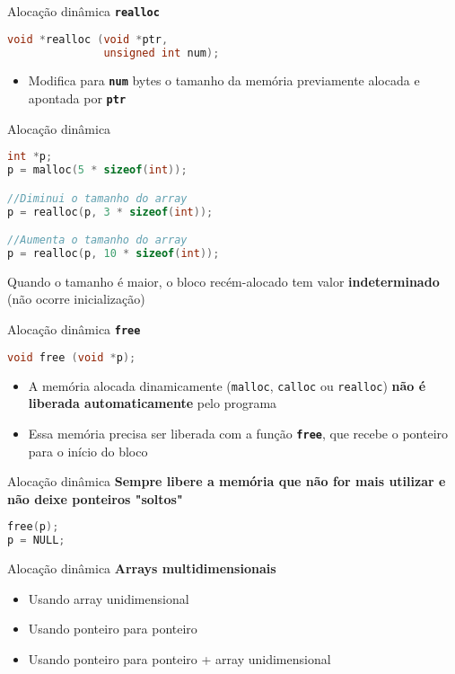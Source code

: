 \documentclass[10pt]{beamer}
\begin{document}
\begin{frame}[fragile]{Alocação dinâmica}
  \huge
  \textbf{\texttt{realloc}}
  \vfill
  \Large
  \begin{lstlisting}[language=C]
void *realloc (void *ptr,
               unsigned int num);
  \end{lstlisting}
  \vfill
  \large
  \setlength{\leftmargini}{0pt}
  \begin{itemize}
      \item [] Modifica para \textbf{\texttt{num}} bytes o tamanho da memória previamente alocada e apontada por \textbf{\texttt{ptr}}
  \end{itemize}
\end{frame}

\begin{frame}[fragile]{Alocação dinâmica}
  \large
  \vfill
  \begin{lstlisting}[language=C]
int *p;
p = malloc(5 * sizeof(int));

//Diminui o tamanho do array
p = realloc(p, 3 * sizeof(int));

//Aumenta o tamanho do array
p = realloc(p, 10 * sizeof(int));
  \end{lstlisting}
  \vfill
  Quando o tamanho é maior, o bloco recém-alocado tem valor \textbf{indeterminado} (não ocorre inicialização)
\end{frame}

\begin{frame}[fragile]{Alocação dinâmica}
  \huge
  \textbf{\texttt{free}}
  \vfill
  \Large
  \begin{lstlisting}[language=C]
void free (void *p);
  \end{lstlisting}
  \vfill
  \large
  \setlength{\leftmargini}{0pt}
  \begin{itemize}
      \item [] A memória alocada dinamicamente (\texttt{malloc}, \texttt{calloc} ou \texttt{realloc}) \textbf{não é liberada automaticamente} pelo programa \faExclamationTriangle
      \item [] Essa memória precisa ser liberada com a função \textbf{\texttt{free}}, que recebe o ponteiro para o início do bloco
  \end{itemize}
\end{frame}

\begin{frame}[fragile]{Alocação dinâmica}
  \huge
  \textbf{\alert{Sempre} libere a memória que não for mais utilizar e não deixe ponteiros "soltos"}
  \vfill
  \begin{lstlisting}[language=C]
free(p);
p = NULL;
  \end{lstlisting}
\end{frame}

\begin{frame}[fragile]{Alocação dinâmica}
  \huge
  \textbf{Arrays multidimensionais}
  \vfill
  \LARGE
  \begin{itemize}
    \item Usando array unidimensional
    \item Usando ponteiro para ponteiro
    \item Usando ponteiro para ponteiro + array unidimensional
  \end{itemize}
\end{frame}
\end{document}
